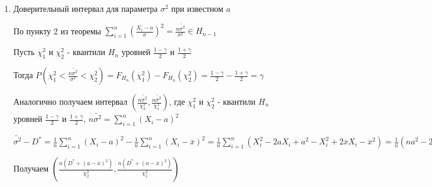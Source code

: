 \begin{enumerate}[label*=\Roman*.]
    По пункту 3 из теоремы $\sum_{i = 1}^n \left(\frac{X_i - \overline{x}}{\sigma}\right)^2 = \frac{(n - 1)S^2}{\sigma^2} = 
    \frac{nD^*}{\sigma^2} \in H_{n - 1}$

    Пусть $\chi_1^2$ и $\chi_2^2$ - квантили $H_{n - 1}$ уровней $\frac{1 - \gamma}{2}$ и $\frac{1 + \gamma}{2}$

    Тогда $P\left(\chi_1^2 < \frac{(n - 1)S^2}{\sigma^2} < \chi_2^2\right) = F_{H_{n - 1}}(\chi_1^2) - F_{H_{n - 1}}(\chi_2^2) = \frac{1 - \gamma}{2} - \frac{1 + \gamma}{2} = \gamma$

    $\chi_1^2 < \frac{(n - 1)S^2}{\sigma^2} < \chi_2^2$

    $\frac{1}{\chi_2^2} < \frac{\sigma^2}{(n - 1)S^2} < \frac{1}{\chi_1^2}$

    $\frac{(n - 1)S^2}{\chi_2^2} < \sigma^2 < \frac{(n - 1)S^2}{\chi_1^2}$ или 
    $\frac{nD^*}{\chi_2^2} < \sigma^2 < \frac{nD^*}{\chi_1^2}$

    Получаем интервал $\left(\frac{(n - 1)S^2}{\chi_2^2}, \frac{(n - 1)S^2}{\chi_1^2}\right)$, где $\chi_1^2$ и $\chi_2^2$ - квантили $H_{n - 1}$ уровней $\frac{1 - \gamma}{2}$ и $\frac{1 + \gamma}{2}$

    \Nota Данный интервал не симметричен относительно неизвестного параметра $\sigma^2$

    \item Доверительный интервал для параметра $\sigma^2$ при известном $a$

    По пункту 2 из теоремы $\sum_{i = 1}^n \left(\frac{X_i - a}{\sigma}\right)^2 = \frac{n \tilde{\sigma^2}}{\sigma^2} \in H_{n - 1}$
    
    Пусть $\chi_1^2$ и $\chi_2^2$ - квантили $H_{n}$ уровней $\frac{1 - \gamma}{2}$ и $\frac{1 + \gamma}{2}$

    Тогда $P\left(\chi_1^2 < \frac{n \tilde{\sigma^2}}{\sigma^2} < \chi_2^2\right) = F_{H_{n}}(\chi_1^2) - F_{H_{n}}(\chi_2^2) = \frac{1 - \gamma}{2} - \frac{1 + \gamma}{2} = \gamma$

    Аналогично получаем интервал $\left(\frac{n \tilde{\sigma^2}}{\chi_2^2}, \frac{n \tilde{\sigma^2}}{\chi_1^2}\right)$, 
    где $\chi_1^2$ и $\chi_2^2$ - квантили $H_{n}$ уровней $\frac{1 - \gamma}{2}$ и $\frac{1 + \gamma}{2}$, $n \tilde{\sigma^2} = \sum_{i = 1}^n (X_i - a)^2$

    \Nota $\tilde{\sigma^2} - D^* = \frac{1}{n} \sum_{i = 1}^n (X_i - a)^2 - \frac{1}{n} \sum_{i = 1}^n (X_i - \overline{x})^2 = 
    \frac{1}{n} \sum_{i = 1}^n (X_i^2 - 2aX_i + a^2 - X_i^2 + 2 \overline{x} X_i - \overline{x}^2) = 
    \frac{1}{n} (na^2 - 2a n \overline{x} + 2 \overline{x} \cdot n \overline{x} - n \overline{x}^2) = 
    a^2 - 2a \overline{x} + \overline{x}^2 = (a - \overline{x})^2 \Longrightarrow \tilde{\sigma^2} = D^* + (a - \overline{x})^2$

    Получаем $\left(\frac{n (D^* + (a - \overline{x})^2)}{\chi_2^2}, \frac{n (D^* + (a - \overline{x})^2)}{\chi_1^2}\right)$

\end{enumerate}

